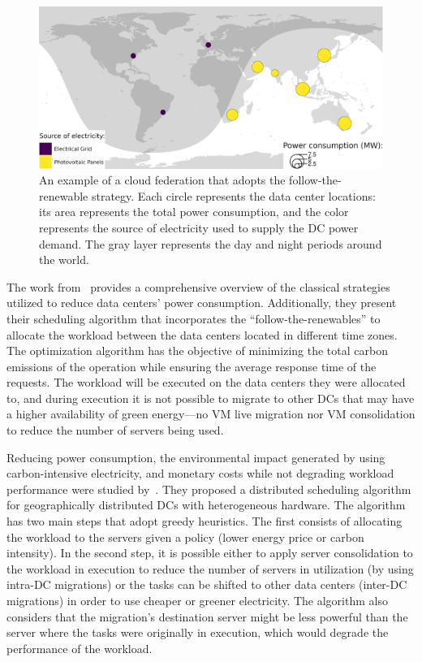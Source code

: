 \begin{figure}[h]
\centering
  \includegraphics[width=\linewidth]{images/example_follow_the_renewables.png}
  \caption{An example of a cloud federation that adopts the follow-the-renewable strategy. Each circle represents the data center locations: its area represents the total power consumption, and the color represents the source of electricity used to supply the DC power demand. The gray layer represents the day and night periods around the world.}
  \label{fig:ex_follow_the_renewables}
\end{figure}


The work from~\citet{XU2020191} provides a comprehensive overview of the classical strategies utilized to reduce data centers' power consumption. Additionally, they present their scheduling algorithm that incorporates the ``follow-the-renewables'' to allocate the workload between the data centers located in different time zones. The optimization algorithm has the objective of minimizing the total carbon emissions of the operation while ensuring the average response time of the requests. The workload will be executed on the data centers they were allocated to, and during execution it is not possible to migrate to other DCs that may have a higher availability of green energy---no VM live migration nor VM consolidation to reduce the number of servers being used.



Reducing power consumption, the environmental impact generated by using carbon-intensive electricity, and monetary costs while not degrading workload performance were studied by~\citet{ALI2021110907}. They proposed a distributed scheduling algorithm for geographically distributed DCs with heterogeneous hardware. The algorithm has two main steps that adopt greedy heuristics. The first consists of allocating the workload to the servers given a policy (lower energy price or carbon intensity). In the second step, it is possible either to apply server consolidation to the workload in execution to reduce the number of servers in utilization (by using intra-DC migrations) or the tasks can be shifted to other data centers (inter-DC migrations) in order to use cheaper or greener electricity. The algorithm also considers that the migration's destination server might be less powerful than the server where the tasks were originally in execution, which would degrade the performance of the workload.

